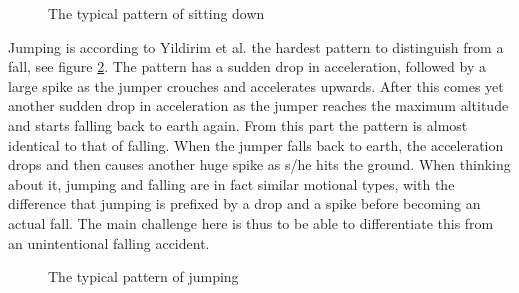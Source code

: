 \documentclass[12pt, a4paper, onecolumn]{article}
\begin{document}
	\begin{figure}[H]
		\centering
		\caption{The typical pattern of sitting down}%
		\label{fig:Pattern-Sittin}%
	\end{figure}
	
	Jumping is according to Yildirim et al. the hardest pattern to distinguish from a fall, see figure \ref{fig:Pattern-Jumping}. The pattern has a sudden drop in acceleration, followed by a large spike as the jumper crouches and accelerates upwards. After this comes yet another sudden drop in acceleration as the jumper reaches the maximum altitude and starts falling back to earth again. From this part the pattern is almost identical to that of falling. When the jumper falls back to earth, the acceleration drops and then causes another huge spike as s/he hits the ground. When thinking about it, jumping and falling are in fact similar motional types, with the difference that jumping is prefixed by a drop and a spike before becoming an actual fall. The main challenge here is thus to be able to differentiate this from an unintentional falling accident.
	
	\begin{figure}[H]
		\centering
		\caption{The typical pattern of jumping}%
		\label{fig:Pattern-Jumping}%
	\end{figure}
	
\end{document}
